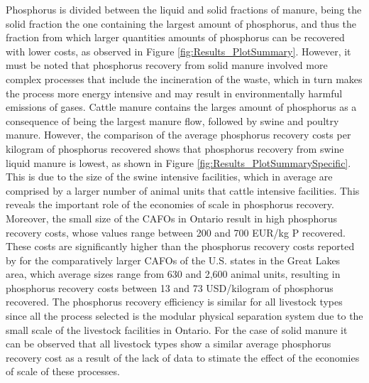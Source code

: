 \documentclass[authoryear]{elsarticle}
\begin{document}
Phosphorus is divided between the liquid and solid fractions of manure, being the solid fraction the one containing the largest amount of phosphorus, and thus the fraction from which larger quantities amounts of phosphorus can be recovered with lower costs, as observed in Figure \ref{fig:Results_PlotSummary}. However, it must be noted that phosphorus recovery from solid manure involved more complex processes that include the incineration of the waste, which in turn makes the process more energy intensive and may result in environmentally harmful emissions of gases. Cattle manure contains the larges amount of phosphorus as a consequence of being the largest manure flow, followed by swine and poultry manure. However, the comparison of the average phosphorus recovery costs per kilogram of phosphorus recovered shows that phosphorus recovery from swine liquid manure is lowest, as shown in Figure \ref{fig:Results_PlotSummarySpecific}. This is due to the size of the swine intensive facilities, which in average are comprised by a larger number of animal units that cattle intensive facilities. This reveals the important role of the economies of scale in phosphorus recovery. Moreover, the small size of the CAFOs in Ontario result in high phosphorus recovery costs, whose values range between 200 and 700 EUR/kg P recovered. These costs are significantly higher than the phosphorus recovery costs reported by \citet{martin2022analysis} for the comparatively larger CAFOs of the U.S. states in the Great Lakes area, which average sizes range from 630 and 2,600 animal units, resulting in phosphorus recovery costs between 13 and 73 USD/kilogram of phosphorus recovered. The phosphorus recovery efficiency is similar for all livestock types since all the process selected is the modular physical separation system due to the small scale of the livestock facilities in Ontario. For the case of solid manure it can be observed that all livestock types show a similar average phosphorus recovery cost as a result of the lack of data to stimate the effect of the economies of scale of these processes.
\end{document}
